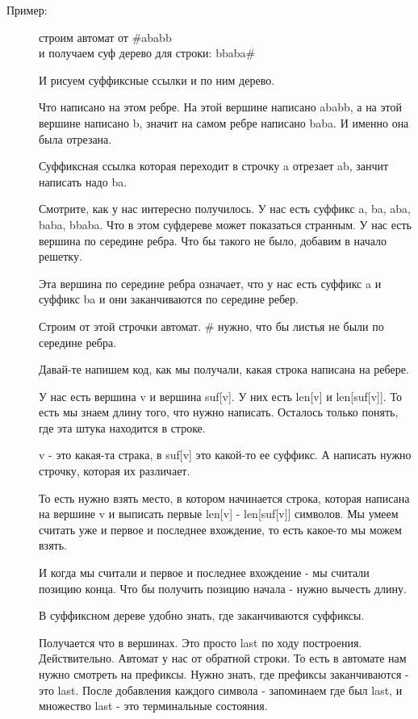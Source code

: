     \begin{description}
    \item[Пример:]

    строим автомат от \#ababb\\ 
    и получаем суф дерево для строки: bbaba\#

    И рисуем суффиксные ссылки и
    по ним дерево.

    Что написано на этом ребре. На этой вершине написано 
    ababb, а на этой вершине написано b, значит на 
    самом ребре написано baba. И именно она была отрезана.

    Суффиксная ссылка которая переходит в строчку a отрезает ab,
    занчит написать надо ba.

    Смотрите, как у нас интересно получилось.
    У нас есть суффикс a, ba, aba, baba, bbaba.
    Что в этом суфдереве может показаться странным. У нас
    есть вершина по середине ребра. Что бы такого
    не было, добавим в начало решетку.  

    Эта вершина по середине ребра означает, что у нас 
    есть суффикс a и суффикс ba  и они заканчиваются по середине ребер. 

    Строим от этой строчки автомат. 
    $\#$ нужно, что бы листья не были по 
    середине ребра. 

    Давай-те напишем код, как
    мы получали, какая строка написана на ребере. 

    У нас есть вершина v и вершина suf[v].  У них 
    есть len[v] и len[suf[v]]. То есть 
    мы знаем длину того, что нужно 
    написать. Осталось только понять, 
    где эта штука находится в строке.

    v - это какая-та страка, в suf[v] это 
    какой-то ее суффикс. А написать
    нужно строчку, которая их различает.

    То есть нужно взять место, в котором начинается 
    строка, которая написана на вершине v и выписать 
    первые len[v] - len[suf[v]] символов. Мы
    умеем считать уже и первое и последнее вхождение, то
    есть какое-то мы можем взять.

    И когда мы считали и первое и последнее вхождение - мы
    считали позицию конца. Что бы получить позицию
    начала - нужно вычесть длину.   

    В суффиксном дереве удобно знать, где заканчиваются суффиксы. 
    
    Получается что в вершинах. Это просто last по 
    ходу построения. Действительно. Автомат у нас 
    от обратной строки. То есть в автомате нам 
    нужно смотреть на префиксы. Нужно
    знать, где префиксы заканчиваются - это last.
    После добавления каждого символа - запоминаем 
    где был last, и множество last - это терминальные 
    состояния. 


\end{description}
